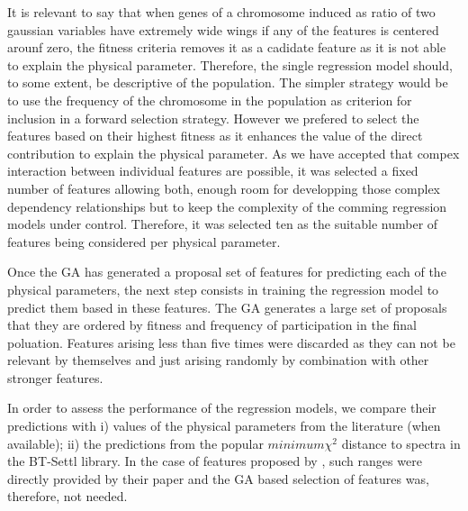 It is relevant to say that when genes of a chromosome induced as ratio
of two gaussian variables have extremely wide wings if any of the features 
is centered arounf zero, the fitness criteria removes it as a cadidate feature
as it is not able to explain the physical parameter. 
Therefore, the single regression model should, to some
extent, be descriptive of the population. The simpler strategy
would be to use the frequency of the chromosome in the population as
criterion for inclusion in a forward selection strategy. However we
prefered to select the features based on their highest fitness as it
enhances the value of the direct contribution to explain the physical 
parameter. 
As we have accepted that compex interaction between individual features 
are possible, it was selected a fixed number of features allowing both,
enough room for developping those complex dependency relationships but
to keep the complexity of the comming regression models under control.
Therefore, it was selected ten as the suitable number of features being considered 
per physical parameter.

Once the GA has generated a proposal set of features for predicting
each of the physical parameters, the next step consists in training
the regression model to predict them based in these features.  The GA
generates a large set of proposals that they are ordered by fitness and frequency of 
participation in the final poluation. 
Features arising less than five times were discarded as they can not be 
relevant by themselves and just arising randomly by combination with other
stronger features.

In order to assess the performance of the regression models, we
compare their predictions with i) values of the physical parameters
from the literature (when available); ii) the predictions from the
popular $minimum \chi^2$ distance to spectra in the BT-Settl library.
In the case of features proposed by \cite{cesetti}, such ranges were
directly provided by their paper and the GA based selection of features 
was, therefore, not needed.

